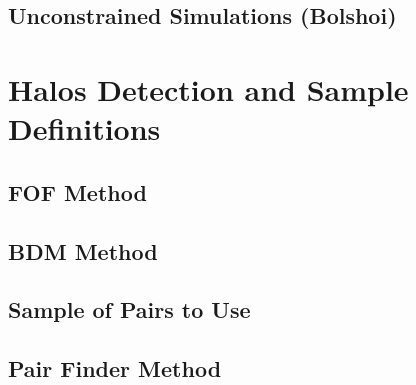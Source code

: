 	\subsection{Unconstrained Simulations (Bolshoi)}
	\label{subsec:UnconstrainedSimulations}





\section{Halos Detection and Sample Definitions}
\label{sec:HalosDetectionAndSampleDefinitions}


	\subsection{FOF Method}
	\label{subsec:FOFMethod}


	\subsection{BDM Method}
	\label{subsec:BDMMethod}
	
	
	\subsection{Sample of Pairs to Use}
	\label{subsec:SampleOfPairsToUse}
	
	
	\subsection{Pair Finder Method}
	\label{subsec:PairFinderMethod}


